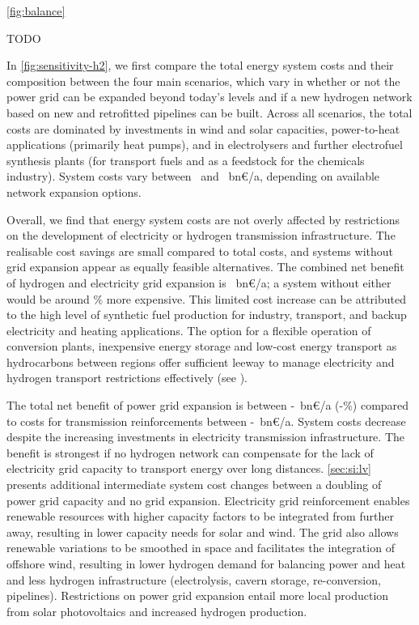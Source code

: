 \cref{fig:balance}

TODO

In \cref{fig:sensitivity-h2}, we first compare the total energy system costs and
their composition between the four main scenarios, which vary in whether or not
the power grid can be expanded beyond today's levels and if a new hydrogen
network based on new and retrofitted pipelines can be built. Across all
scenarios, the total costs are dominated by investments in wind and solar
capacities, power-to-heat applications (primarily heat pumps), and in
electrolysers and further electrofuel synthesis plants (for transport fuels and
as a feedstock for the chemicals industry). System costs vary between
\minsystemcost~and \maxsystemcost~bn\euro/a, depending on available network
expansion options.

Overall, we find that energy system costs are not overly affected by restrictions on
the development of electricity or hydrogen transmission infrastructure. The
realisable cost savings are small compared to total costs, and systems
without grid expansion appear as equally feasible alternatives. The
combined net benefit of hydrogen and electricity grid expansion is
\gridbenefitabs~bn\euro/a; a system without either would be around
\gridbenefitrel\% more expensive. This limited cost increase can be attributed
to the high level of synthetic fuel production for industry, transport, and
backup electricity and heating applications. The option for a flexible operation
of conversion plants, inexpensive energy storage and low-cost energy transport as
hydrocarbons between regions offer sufficient leeway to manage electricity and
hydrogen transport restrictions effectively (see ).

The total net benefit of power grid expansion is between
\minacbenefitabs-\maxacbenefitabs~bn\euro/a
(\minacbenefitrel-\maxacbenefitrel\%) compared to costs for transmission
reinforcements between \minaccost-\maxaccost~bn\euro/a. System costs decrease
despite the increasing investments in electricity transmission infrastructure.
The benefit is strongest if no hydrogen network can compensate for the lack of
electricity grid capacity to transport energy over long distances.
\cref{sec:si:lv} presents additional intermediate system cost changes between a
doubling of power grid capacity and no grid expansion. Electricity grid
reinforcement enables renewable resources with higher capacity factors to be
integrated from further away, resulting in lower capacity needs for solar and
wind. The grid also allows renewable variations to be smoothed in space and
facilitates the integration of offshore wind, resulting in lower hydrogen demand
for balancing power and heat and less hydrogen infrastructure (electrolysis,
cavern storage, re-conversion, pipelines). Restrictions on power grid expansion
entail more local production from solar photovoltaics and increased hydrogen
production.

